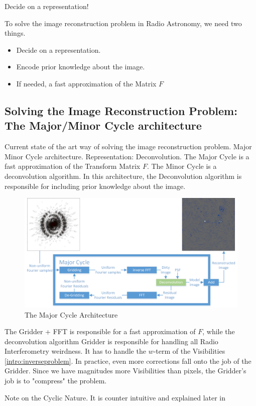 Decide on a representation!

To solve the image reconstruction problem in Radio Astronomy, we need two things.
\begin{itemize}
	\item Decide on a representation.
	\item Encode prior knowledge about the image.
	\item If needed, a fast approximation of the Matrix $F$
\end{itemize} 


\subsection{Solving the Image Reconstruction Problem: The Major/Minor Cycle architecture}
Current state of the art way of solving the image reconstruction problem. Major Minor Cycle architecture.
Representation: Deconvolution.
The Major Cycle is a fast approximation of the Transform Matrix $F$.
The Minor Cycle is a deconvolution algorithm. In this architecture, the Deconvolution algorithm is responsible for including prior knowledge about the image.

\begin{figure}[h]
	\centering
	\includegraphics[width=0.80\linewidth]{./chapters/02.hypo/Major-Minor3.png}
	\caption{The Major Cycle Architecture}
	\label{intro:major}
\end{figure}

The Gridder + FFT is responsible for a fast approximation of $F$, while the deconvolution algorithm
Gridder is responsible for handling all Radio Interferometry weirdness. It has to handle the $w$-term of the Visibilities \eqref{intro:inverseproblem}. In practice, even more corrections fall onto the job of the Gridder. Since we have magnitudes more Visibilities than pixels, the Gridder's job is to "compress" the problem.

Note on the Cyclic Nature. It is counter intuitive and explained later in 

